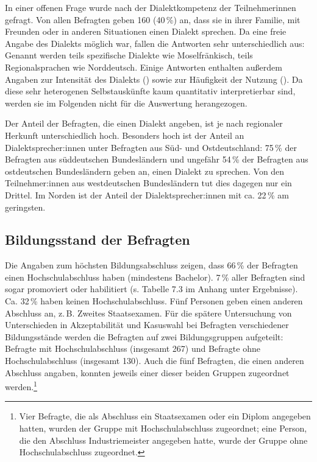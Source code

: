 In einer offenen Frage wurde nach der Dialektkompetenz der Teilnehmer\BreakableGenderColon{}innen gefragt. 
Von allen Befragten geben 160 (40\,\%) an, dass sie in ihrer Familie, mit Freunden oder in anderen Situationen einen Dialekt sprechen. 
Da eine freie Angabe des Dialekts möglich war, fallen die Antworten sehr unterschiedlich aus: 
Genannt werden teils spezifische Dialekte wie Moselfränkisch, teils Regionalsprachen wie Norddeutsch.  
Einige Antworten enthalten außerdem Angaben zur Intensität des Dialekts () sowie zur Häufigkeit der Nutzung (). 
Da diese sehr heterogenen Selbstauskünfte kaum quantitativ interpretierbar sind, werden sie im Folgenden nicht für die Auswertung herangezogen.

Der Anteil der Befragten, die einen Dialekt angeben, ist je nach regionaler Herkunft unterschiedlich hoch. 
Besonders hoch ist der Anteil an Dialektsprecher:innen unter Befragten aus Süd- und Ostdeutschland: 
75\,\% der Befragten aus süddeutschen Bundesländern und ungefähr 54\,\% der Befragten aus ostdeutschen Bundesländern geben an, einen Dialekt zu sprechen. 
Von den Teilnehmer:innen aus westdeutschen Bundesländern tut dies dagegen nur ein Drittel.
Im Norden ist der Anteil der Dialektsprecher:innen mit ca. 22\,\% am geringsten. 
\subsection{Bildungsstand der Befragten}
\label{sec:Bildung}
Die Angaben zum höchsten Bildungsabschluss zeigen, dass 66\,\% der Befragten einen Hochschulabschluss haben (mindestens Bachelor). 7\,\% aller Befragten sind sogar promoviert oder habilitiert (s. Tabelle 7.3 im Anhang unter Ergebnisse). 
Ca. 32\,\% haben keinen Hochschulabschluss. 
Fünf Personen geben einen anderen Abschluss an, z.\,B. Zweites Staatsexamen. 
Für die spätere Untersuchung von Unterschieden in Akzeptabilität und Kasuswahl bei Befragten verschiedener Bildungsstände werden die Befragten auf zwei Bildungsgruppen aufgeteilt: 
Befragte mit Hochschulabschluss (insgesamt 267) und Befragte ohne Hochschulabschluss (insgesamt 130). 
Auch die fünf Befragten, die einen anderen Abschluss angaben, konnten jeweils einer dieser beiden Gruppen zugeordnet werden.\footnote{Vier Befragte, die als Abschluss ein Staatsexamen oder ein Diplom angegeben hatten, wurden der Gruppe mit Hochschulabschluss zugeordnet; eine Person, die den Abschluss Industriemeister angegeben hatte, wurde der Gruppe ohne Hochschulabschluss zugeordnet.}

